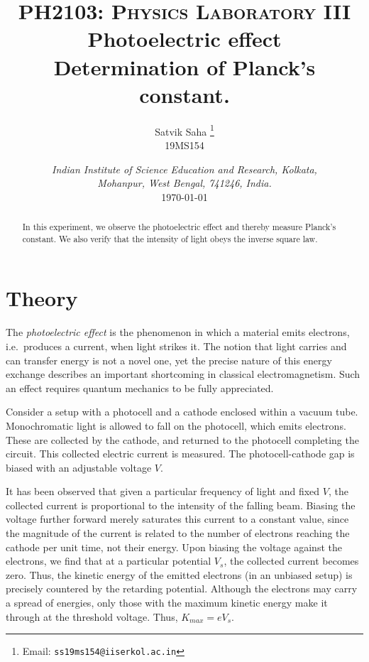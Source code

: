\documentclass[11pt]{article}
\title{
        \Large\textsc{PH2103: Physics Laboratory III} \\
        \vspace{10pt}
        \Huge \textbf{Photoelectric effect} \\
        \vspace{5pt}
        \large{Determination of Planck's constant.}
}
\author{
        \large Satvik Saha%
        \thanks{Email: \tt ss19ms154@iiserkol.ac.in}
        \\\textsc{\small 19MS154}
}
\date{\normalsize
        \textit{Indian Institute of Science Education and Research, Kolkata, \\
        Mohanpur, West Bengal, 741246, India.} \\
        \vspace{10pt}
        \today
}
\begin{document}
        \maketitle

        \begin{abstract}
                In this experiment, we observe the photoelectric effect and thereby measure Planck's constant.
                We also verify that the intensity of light obeys the inverse square law.
        \end{abstract}

        \section{Theory}
        The \textit{photoelectric effect} is the phenomenon in which a material emits electrons, i.e.\ produces a current, when light strikes it.
        The notion that light carries and can transfer energy is not a novel one, yet the precise nature of this energy exchange describes
        an important shortcoming in classical electromagnetism. Such an effect requires quantum mechanics to be fully appreciated.

        Consider a setup with a photocell and a cathode enclosed within a vacuum tube. Monochromatic light is allowed to fall on the photocell,
        which emits electrons. These are collected by the cathode, and returned to the photocell completing the circuit. This collected
        electric current is measured. The photocell-cathode gap is biased with an adjustable voltage $V$.

        It has been observed that given a particular frequency of light and fixed $V$, the collected current is proportional to the intensity of
        the falling beam. Biasing the voltage further forward merely saturates this current to a constant value, since the magnitude of the
        current is related to the number of electrons reaching the cathode per unit time, not their energy. Upon biasing the voltage against the
        electrons, we find that at a particular potential $V_s$, the collected current becomes zero. Thus, the kinetic energy of the emitted electrons
        (in an unbiased setup) is precisely countered by the retarding potential. Although the electrons may carry a spread of energies,
        only those with the maximum kinetic energy make it through at the threshold voltage. Thus, $K_{max} = eV_s$.
\end{document}
